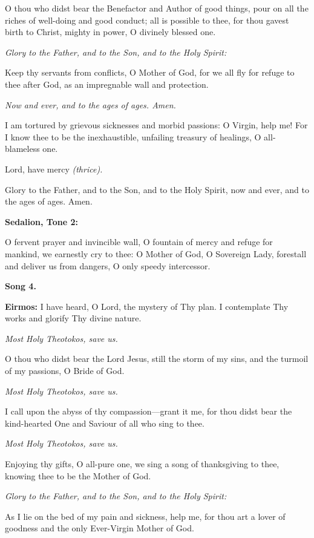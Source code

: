 O thou who didst bear the Benefactor and Author of good things, pour on all the riches of well-doing and good conduct; 
all is possible to thee, for thou gavest birth to Christ, mighty in power, O divinely blessed one.

\emph{Glory to the Father, and to the Son, and to the Holy Spirit:}

Keep thy servants from conflicts, O Mother of God, for we all fly for refuge to thee after God, as an impregnable wall and protection.

\emph{Now and ever, and to the ages of ages. Amen.}

I am tortured by grievous sicknesses and morbid passions: O Virgin, help me! 
For I know thee to be the inexhaustible, unfailing treasury of healings, O all-blameless one.

Lord, have mercy 
\emph{(thrice).}

Glory to the Father, and to the Son, and to the Holy Spirit, now and ever, and to the ages of ages. Amen.

\textbf{Sedalion, Tone 2:}

O fervent prayer and invincible wall, O fountain of mercy and refuge for mankind, we earnestly cry to thee: 
O Mother of God, O Sovereign Lady, forestall and deliver us from dangers, O only speedy intercessor.

\textbf{Song 4.}

\textbf{Eirmos:} I have heard, O Lord, the mystery of Thy plan. 
I contemplate Thy works and glorify Thy divine nature.

\emph{Most Holy Theotokos, save us.}

O thou who didst bear the Lord Jesus, still the storm of my sins, and the turmoil of my passions, O Bride of God.

\emph{Most Holy Theotokos, save us.}

I call upon the abyss of thy compassion---grant it me, for thou didst bear the kind-hearted One and Saviour of all who sing to thee.

\emph{Most Holy Theotokos, save us.}

Enjoying thy gifts, O all-pure one, we sing a song of thanksgiving to thee, knowing thee to be the Mother of God.

\emph{Glory to the Father, and to the Son, and to the Holy Spirit:}

As I lie on the bed of my pain and sickness, help me, for thou art a lover of goodness and the only Ever-Virgin Mother of God.

